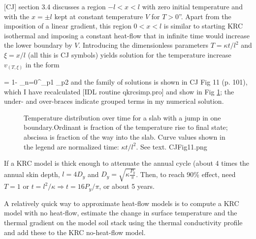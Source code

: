 \documentclass{article}
\begin{document}
 [CJ] section 3.4 discusses a region $-l <x<l$ with zero
initial temperature and with the $x=\pm l$ kept at constant temperature $V$ for
$T>0$''. Apart from the imposition of a linear gradient, this region $0<x<l$ is
similar to starting KRC isothermal and imposing a constant heat-flow that in
infinite time would increase the lower boundary by $V$.  Introducing the
dimensionless parameters $T=\kappa t/ l^2$ and $\xi=x/l$ (all this is CJ
symbols) yields solution for the temperature increase $v_{(T,\xi)}$ in the form

\qbn {}= 1- \sum _{n=0}^\infty {}_{p1} _{p2}
\mc [3.4.4]\qen and the family of solutions is shown in CJ Fig 11 (p. 101),
which I have recalculated [IDL routine qkrcsimp.pro] and show in Fig
\ref{CJFig11}; the under- and over-braces indicate grouped terms in my numerical
solution.

\begin{figure}[!ht] 
\caption[Thermal diffusion from one boundary]{Temperature distribution over time
  for a slab with a jump in one boundary.Ordinant is fraction of the temperature
  rise to final state; abscissa is fraction of the way into the slab. Curve
  values shown in the legend are normalized time: $\kappa t/ l^2$. See text.
\label{CJFig11} CJFig11.png  }
\end{figure} 

If a KRC model is thick enough to attenuate the annual cycle (about 4 times the
annual skin depth, $l=4D_y$ and $D_y=\sqrt{\kappa \frac{P_y}{\pi}} $. Then, to
reach 90\% effect, need $T=1$ or $t=l^2/\kappa \Rightarrow t=16 P_y/\pi$, or
about 5 years.

A relatively quick way to approximate heat-flow models is to compute a KRC model
with no heat-flow, estimate the change in surface temperature and the thermal
gradient on the model soil stack using the thermal conductivity profile and add
these to the KRC no-heat-flow model.
\end{document}
